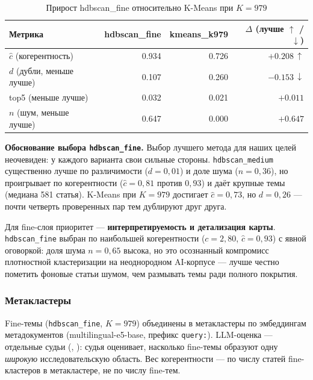 \begin{table}[ht]
\caption{Прирост hdbscan\_fine относительно K-Means при $K = 979$}
\label{tab:cluster-delta}
\centering
\footnotesize
\begin{tabular}{lrrr}
\toprule
Метрика & hdbscan\_fine & kmeans\_k979 & $\Delta$ (лучше $\uparrow$ / $\downarrow$) \\
\midrule
$\hat{c}$ (когерентность) & 0.934 & 0.726 & $+0.208\,\uparrow$ \\
$d$ (дубли, меньше лучше) & 0.107 & 0.260 & $-0.153\,\downarrow$ \\
top5 (меньше лучше)       & 0.032 & 0.021 & $+0.011$ \\
$n$ (шум, меньше лучше)   & 0.647 & 0.000 & $+0.647$ \\
\bottomrule
\end{tabular}
\end{table}

\textbf{Обоснование выбора \texttt{hdbscan\_fine}.} Выбор лучшего метода для наших целей неочевиден:
у каждого варианта свои сильные стороны. \texttt{hdbscan\_medium} существенно лучше по различимости
($d = 0{,}01$) и доле шума ($n = 0{,}36$), но проигрывает по когерентности ($\hat{c} = 0{,}81$
против $0{,}93$) и даёт крупные темы (медиана 581 статья). K-Means при $K = 979$ достигает
$\hat{c} = 0{,}73$, но $d = 0{,}26$ — почти четверть проверенных пар тем дублируют друг друга.

Для fine-слоя приоритет — \textbf{интерпретируемость и детализация карты}. \texttt{hdbscan\_fine}
выбран по наибольшей когерентности ($c = 2{,}80$, $\hat{c} = 0{,}93$) с явной оговоркой: доля
шума $n = 0{,}65$ высока, но это осознанный компромисс плотностной кластеризации на
неоднородном AI-корпусе — лучше честно пометить фоновые статьи шумом, чем размывать темы ради
полного покрытия.

\subsubsection{Метакластеры}

Fine-темы (\texttt{hdbscan\_fine}, $K = 979$) объединены в метакластеры по эмбеддингам
метадокументов (multilingual-e5-base, префикс \texttt{query:}). LLM-оценка — отдельные судьи
(, ): судья оценивает,
насколько fine-темы образуют одну \emph{широкую} исследовательскую область. Вес когерентности —
по числу статей fine-кластеров в метакластере, не по числу fine-тем.

